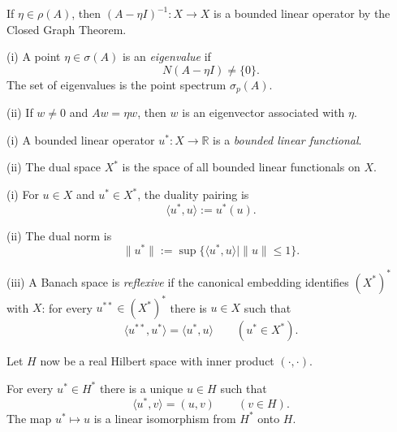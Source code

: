 \begin{remark}
\label{rem:resolvent-inverse-bounded}
If $\eta\in\rho(A)$, then $(A-\eta I)^{-1}:X\to X$ is a bounded linear operator by the Closed Graph Theorem.
\end{remark}

\begin{definition}
\label{def:eigenvalue-eigenvector-appendix-d}
(i) A point $\eta\in\sigma(A)$ is an \textit{eigenvalue} if
\[
N(A-\eta I)\ne\{0\}.
\]
The set of eigenvalues is the point spectrum $\sigma_p(A)$.

(ii) If $w\ne0$ and $Aw=\eta w$, then $w$ is an eigenvector associated with $\eta$.
\end{definition}

\begin{definition}
\label{def:bounded-linear-functional-dual-space}
(i) A bounded linear operator $u^*:X\to\mathbb R$ is a \textit{bounded linear functional}.

(ii) The dual space $X^*$ is the space of all bounded linear functionals on $X$.
\end{definition}

\begin{definition}
\label{def:dual-pairing-reflexive-banach-space}
(i) For $u\in X$ and $u^*\in X^*$, the duality pairing is
\[
\langle u^*,u\rangle:=u^*(u).
\]

(ii) The dual norm is
\[
\|u^*\|:=\sup\{\langle u^*,u\rangle\mid\|u\|\leq1\}.
\]

(iii) A Banach space is \textit{reflexive} if the canonical embedding identifies $(X^*)^*$ with $X$: for every $u^{**}\in(X^*)^*$ there is $u\in X$ such that
\[
\langle u^{**},u^*\rangle=\langle u^*,u\rangle
\qquad(u^*\in X^*).
\]
\end{definition}

Let $H$ now be a real Hilbert space with inner product $(\cdot,\cdot)$.

\begin{theorem}
\label{thm:riesz-representation-theorem}
For every $u^*\in H^*$ there is a unique $u\in H$ such that
\[
\langle u^*,v\rangle=(u,v)
\qquad(v\in H).
\]
The map $u^*\mapsto u$ is a linear isomorphism from $H^*$ onto $H$.
\end{theorem}

